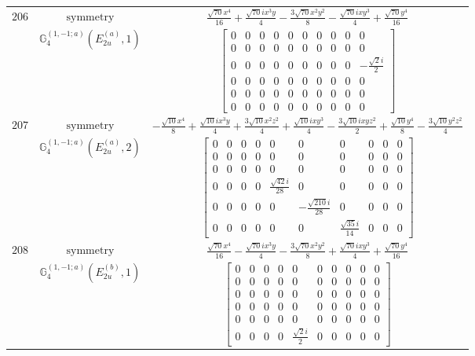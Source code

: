 \documentclass[fleqn,8pt,landscape]{jsarticle}
\begin{document}
\begin{longtable}{ccc}
$ 206 $ & $ \text{symmetry} $ & $ \frac{\sqrt{70} x^{4}}{16} + \frac{\sqrt{70} i x^{3} y}{4} - \frac{3 \sqrt{70} x^{2} y^{2}}{8} - \frac{\sqrt{70} i x y^{3}}{4} + \frac{\sqrt{70} y^{4}}{16} $ \\
$  $ & $ \mathbb{G}_{4}^{(1,-1;a)}(E_{2u}^{(a)},1) $ & $ \begin{bmatrix} 0 & 0 & 0 & 0 & 0 & 0 & 0 & 0 & 0 & 0 \\ 0 & 0 & 0 & 0 & 0 & 0 & 0 & 0 & 0 & 0 \\ 0 & 0 & 0 & 0 & 0 & 0 & 0 & 0 & 0 & - \frac{\sqrt{2} i}{2} \\ 0 & 0 & 0 & 0 & 0 & 0 & 0 & 0 & 0 & 0 \\ 0 & 0 & 0 & 0 & 0 & 0 & 0 & 0 & 0 & 0 \\ 0 & 0 & 0 & 0 & 0 & 0 & 0 & 0 & 0 & 0 \end{bmatrix} $ \\ \hline
$ 207 $ & $ \text{symmetry} $ & $ - \frac{\sqrt{10} x^{4}}{8} + \frac{\sqrt{10} i x^{3} y}{4} + \frac{3 \sqrt{10} x^{2} z^{2}}{4} + \frac{\sqrt{10} i x y^{3}}{4} - \frac{3 \sqrt{10} i x y z^{2}}{2} + \frac{\sqrt{10} y^{4}}{8} - \frac{3 \sqrt{10} y^{2} z^{2}}{4} $ \\
$  $ & $ \mathbb{G}_{4}^{(1,-1;a)}(E_{2u}^{(a)},2) $ & $ \begin{bmatrix} 0 & 0 & 0 & 0 & 0 & 0 & 0 & 0 & 0 & 0 \\ 0 & 0 & 0 & 0 & 0 & 0 & 0 & 0 & 0 & 0 \\ 0 & 0 & 0 & 0 & 0 & 0 & 0 & 0 & 0 & 0 \\ 0 & 0 & 0 & 0 & \frac{\sqrt{42} i}{28} & 0 & 0 & 0 & 0 & 0 \\ 0 & 0 & 0 & 0 & 0 & - \frac{\sqrt{210} i}{28} & 0 & 0 & 0 & 0 \\ 0 & 0 & 0 & 0 & 0 & 0 & \frac{\sqrt{35} i}{14} & 0 & 0 & 0 \end{bmatrix} $ \\ \hline
$ 208 $ & $ \text{symmetry} $ & $ \frac{\sqrt{70} x^{4}}{16} - \frac{\sqrt{70} i x^{3} y}{4} - \frac{3 \sqrt{70} x^{2} y^{2}}{8} + \frac{\sqrt{70} i x y^{3}}{4} + \frac{\sqrt{70} y^{4}}{16} $ \\
$  $ & $ \mathbb{G}_{4}^{(1,-1;a)}(E_{2u}^{(b)},1) $ & $ \begin{bmatrix} 0 & 0 & 0 & 0 & 0 & 0 & 0 & 0 & 0 & 0 \\ 0 & 0 & 0 & 0 & 0 & 0 & 0 & 0 & 0 & 0 \\ 0 & 0 & 0 & 0 & 0 & 0 & 0 & 0 & 0 & 0 \\ 0 & 0 & 0 & 0 & 0 & 0 & 0 & 0 & 0 & 0 \\ 0 & 0 & 0 & 0 & 0 & 0 & 0 & 0 & 0 & 0 \\ 0 & 0 & 0 & 0 & \frac{\sqrt{2} i}{2} & 0 & 0 & 0 & 0 & 0 \end{bmatrix} $ \\ \hline

\end{longtable}
\end{document}
